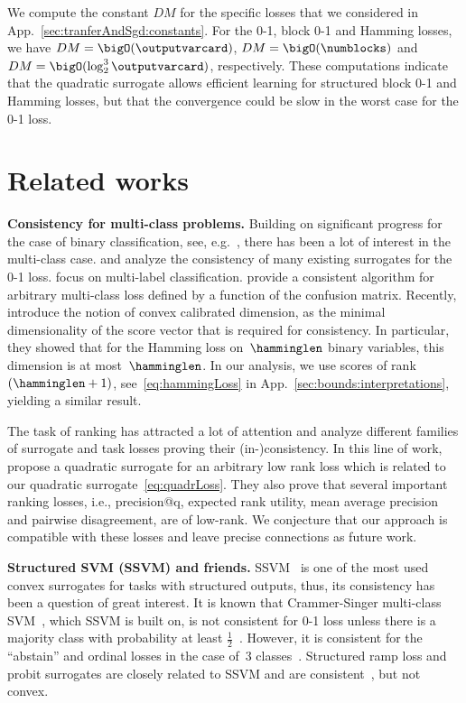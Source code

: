 \documentclass{article}
\begin{document}
We compute the constant $DM$ for the specific losses that we considered in App.~\ref{sec:tranferAndSgd:constants}.
For the 0-1, block 0-1 and Hamming losses, we have $DM = \bigO(\outputvarcard)$, $DM = \bigO(\numblocks)$ and $DM = \bigO(\log_2^3 \outputvarcard)$, respectively.
These computations indicate that the quadratic surrogate allows efficient learning for structured block 0-1 and Hamming losses, but that the convergence could be slow in the worst case for the 0-1 loss.


\section{Related works}
\label{sec:relatedworks}
\textbf{Consistency for multi-class problems.}
Building on significant progress for the case of binary classification, see, e.g.~\cite{bartlett06convexity}, there has been a lot of interest in the multi-class case.
\citet{zhang04} and \citet{tewari07} analyze the consistency of many existing surrogates for the 0-1 loss.
\citet{gao2011multilabel} focus on  multi-label classification.
\citet{narasimhan15} provide a consistent algorithm for arbitrary multi-class loss defined by a function of the confusion matrix.
Recently, \citet{ramaswamy16calibrDim} introduce the notion of convex calibrated dimension, as the minimal dimensionality of the score vector that is required for consistency.
In particular, they showed that for the Hamming loss on~$\hamminglen$ binary variables, this dimension is at most~$\hamminglen$.
In our analysis, we use scores of rank~$(\hamminglen+1)$, see~\eqref{eq:hammingLoss} in App.~\ref{sec:bounds:interpretations}, yielding a similar result.

The task of ranking has attracted a lot of attention and \cite{duchi10,buffoni2011learning,calauzenes12,ramaswamy13rankSurrogates} analyze different families of surrogate and task losses proving their (in-)consistency.
In this line of work, \citet{ramaswamy13rankSurrogates} propose a quadratic surrogate for an arbitrary low rank loss which is related to our quadratic surrogate~\eqref{eq:quadrLoss}.
They also prove that several important ranking losses, i.e.,
precision@q, 
expected rank utility, 
mean average precision and
pairwise disagreement, are of low-rank.
We conjecture that our approach is compatible with these losses and leave precise connections as future work.


%


\textbf{Structured SVM (SSVM) and friends.}
SSVM~\citep{taskar03,taskar2005learning,tsochantaridis05} is one of the most used convex surrogates for tasks with structured outputs, thus, its consistency has been a question of great interest.
It is known that Crammer-Singer multi-class SVM~\citep{crammer01}, which SSVM is built on, is not consistent for 0-1 loss unless there is a majority class with probability at least $\frac12$~\citep{zhang04,mcallester07}.
However, it is consistent for the ``abstain'' and ordinal losses in the case of~$3$ classes~\cite{ramaswamy16calibrDim}.
Structured ramp loss and probit surrogates are closely related to SSVM and are consistent~\citep{mcallester07,chapelle2009tighter,mcallester11,keshet14}, but not convex.
%
%
\end{document}
